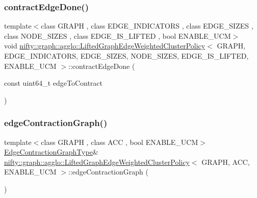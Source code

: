 \subsubsection{\texorpdfstring{contract\+Edge\+Done()}{contractEdgeDone()}\hspace{0.1cm}{\footnotesize\ttfamily [2/2]}}
{\footnotesize\ttfamily template$<$class G\+R\+A\+PH , class E\+D\+G\+E\+\_\+\+I\+N\+D\+I\+C\+A\+T\+O\+RS , class E\+D\+G\+E\+\_\+\+S\+I\+Z\+ES , class N\+O\+D\+E\+\_\+\+S\+I\+Z\+ES , class E\+D\+G\+E\+\_\+\+I\+S\+\_\+\+L\+I\+F\+T\+ED , bool E\+N\+A\+B\+L\+E\+\_\+\+U\+CM$>$ \\
void \hyperlink{classnifty_1_1graph_1_1agglo_1_1LiftedGraphEdgeWeightedClusterPolicy}{nifty\+::graph\+::agglo\+::\+Lifted\+Graph\+Edge\+Weighted\+Cluster\+Policy}$<$ G\+R\+A\+PH, E\+D\+G\+E\+\_\+\+I\+N\+D\+I\+C\+A\+T\+O\+RS, E\+D\+G\+E\+\_\+\+S\+I\+Z\+ES, N\+O\+D\+E\+\_\+\+S\+I\+Z\+ES, E\+D\+G\+E\+\_\+\+I\+S\+\_\+\+L\+I\+F\+T\+ED, E\+N\+A\+B\+L\+E\+\_\+\+U\+CM $>$\+::contract\+Edge\+Done (\begin{DoxyParamCaption}\item[{const uint64\+\_\+t}]{edge\+To\+Contract }\end{DoxyParamCaption})\hspace{0.3cm}{\ttfamily [inline]}}

\mbox{\label{classnifty_1_1graph_1_1agglo_1_1LiftedGraphEdgeWeightedClusterPolicy_ac94fd9193c674df9e2c3afb9cd3781ae}} 
\subsubsection{\texorpdfstring{edge\+Contraction\+Graph()}{edgeContractionGraph()}\hspace{0.1cm}{\footnotesize\ttfamily [1/2]}}
{\footnotesize\ttfamily template$<$class G\+R\+A\+PH , class A\+CC , bool E\+N\+A\+B\+L\+E\+\_\+\+U\+CM$>$ \\
\hyperlink{classnifty_1_1graph_1_1agglo_1_1LiftedGraphEdgeWeightedClusterPolicy_a20c8dc11217be76cda874a9ef9720e92}{Edge\+Contraction\+Graph\+Type}\& \hyperlink{classnifty_1_1graph_1_1agglo_1_1LiftedGraphEdgeWeightedClusterPolicy}{nifty\+::graph\+::agglo\+::\+Lifted\+Graph\+Edge\+Weighted\+Cluster\+Policy}$<$ G\+R\+A\+PH, A\+CC, E\+N\+A\+B\+L\+E\+\_\+\+U\+CM $>$\+::edge\+Contraction\+Graph (\begin{DoxyParamCaption}{ }\end{DoxyParamCaption})}


